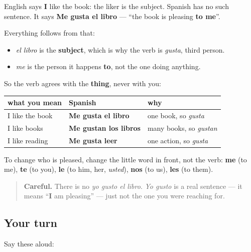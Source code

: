 \begin{grammarlens}[title={Grammar Lens: the thing you like is the subject}]
English says \textbf{I} like the book: the liker is the subject. Spanish has no such sentence. It says \textbf{Me gusta el libro} — \textquotedblleft{}the book is pleasing \textbf{to me}\textquotedblright{}.

Everything follows from that:

\begin{itemize}
\raggedright
  \item \emph{el libro} is the \textbf{subject}, which is why the verb is \emph{gusta}, third person.
  \item \emph{me} is the person it happens \textbf{to}, not the one doing anything.
\end{itemize}

So the verb agrees with the \textbf{thing}, never with you:

\noindent
\begin{tabularx}{\linewidth}{@{}>{\raggedright\arraybackslash}X>{\raggedright\arraybackslash}X>{\raggedright\arraybackslash}X@{}}
\toprule
\textbf{what you mean} & \textbf{Spanish} & \textbf{why} \\
\midrule
I like the book & \textbf{Me gusta el libro} & one book, so \emph{gusta} \\
I like books & \textbf{Me gustan los libros} & many books, so \emph{gustan} \\
I like reading & \textbf{Me gusta leer} & one action, so \emph{gusta} \\
\bottomrule
\end{tabularx}

To change who is pleased, change the little word in front, not the verb: \textbf{me} (to me), \textbf{te} (to you), \textbf{le} (to him, her, \emph{usted}), \textbf{nos} (to us), \textbf{les} (to them).

\begin{quote}
\textbf{Careful.} There is no \emph{yo gusto el libro}. \emph{Yo gusto} is a real sentence — it means \textquotedblleft{}\textbf{I} am pleasing\textquotedblright{} — just not the one you were reaching for.
\end{quote}
\end{grammarlens}

\subsection*{Your turn}
Say these aloud:

